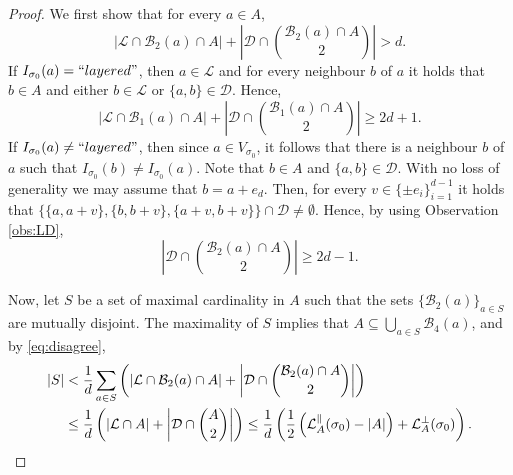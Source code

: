 \documentclass[11pt, reqno]{amsart}
\numberwithin{equation}{section}
\begin{document}
\begin{proof}
We first show that for every $a\in A$,
\begin{equation}
\label{eq:disagree}\lvert{\mathcal L}\cap{\mathcal B}_2(a)\cap A\rvert+\left\lvert{\mathcal D}\cap\binom{{\mathcal B}_2(a)\cap A}{2}\right\rvert>d.
\end{equation}
If $I_{\sigma_0}(a)={\rm ``layered"}$, then $a\in {\mathcal L}$ and for every neighbour $b$ of $a$ it holds that $b\in A$ and either $b\in{\mathcal L}$ or $\{a,b\}\in{\mathcal D}$.
Hence, 
$$\lvert{\mathcal L}\cap{\mathcal B}_1(a)\cap A\rvert+\left\lvert{\mathcal D}\cap\binom{{\mathcal B}_1(a)\cap A}{2}\right\rvert\geq 2d+1.$$
If $I_{\sigma_0}(a)\neq{\rm ``layered"}$, then since $a\in V_{\sigma_0}$, it follows that there is a neighbour $b$ of $a$ such that $I_{\sigma_0}(b)\neq I_{\sigma_0}(a)$. 
Note that $b\in A$ and $\{a,b\}\in{\mathcal D}$.
With no loss of generality we may assume that $b=a+e_d$.
Then, for every $v\in\{\pm e_i\}_{i=1}^{d-1}$ it holds that $\{\{a,a+v\},\{b,b+v\},\{a+v,b+v\}\}\cap{\mathcal D}\neq\emptyset$. Hence, by using Observation \ref{obs:LD},
\begin{equation*}\left\lvert{\mathcal D}\cap\binom{{\mathcal B}_2(a)\cap A}{2}\right\rvert\geq 2d-1.
\end{equation*}

Now, let $S$ be a set of maximal cardinality in $A$ such that the sets $\{{\mathcal B}_2(a)\}_{a\in S}$ are mutually disjoint.
The maximality of $S$ implies that $A\subseteq \bigcup_{a\in S}{\mathcal B}_4(a)$, and by \eqref{eq:disagree}, 
\begin{align*}
\lvert S\rvert&<\frac{1}{d}\sum_{a\in S}\left(\lvert{\mathcal L}\cap{\mathcal B}_2(a)\cap A\rvert+\left\lvert{\mathcal D}\cap\binom{{\mathcal B}_2(a)\cap A}{2}\right\rvert\right)\\
&\leq\frac{1}{d}\left(\lvert{\mathcal L}\cap A\rvert+\left\lvert{\mathcal D}\cap\binom{A}{2}\right\rvert\right)\leq\frac{1}{d}\left(\frac{1}{2}\left(\mathcal{L}^{\parallel}_A(\sigma_0)-|A|\right)+\mathcal{L}^{\perp}_A(\sigma_0)
\right).
\qedhere
\end{align*}
\end{proof}
\end{document}
